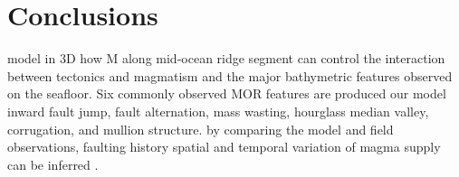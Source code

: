 \pagebreak
\section{Conclusions}
 model in 3D how  M   along   mid-ocean ridge segment can control the interaction between tectonics and magmatism and  the major bathymetric features observed on the seafloor.
Six commonly observed MOR features   are produced  our model  inward fault jump, fault alternation, mass wasting, hourglass median valley, corrugation, and mullion structure. 
 by comparing  the model and   field observations, faulting  history  spatial and temporal variation of magma supply can be inferred .

